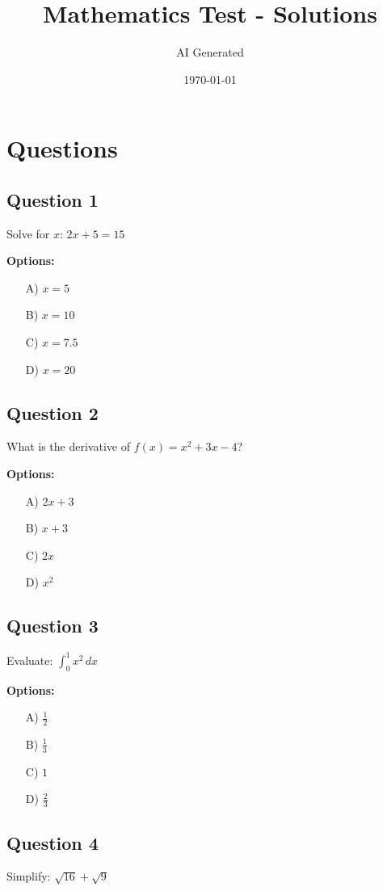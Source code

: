 \documentclass[12pt]{article}
\title{Mathematics Test - Solutions}
\author{AI Generated}
\date{\today}
\begin{document}
\maketitle

\section*{Questions}

\subsection*{Question 1}
Solve for $x$: $2x + 5 = 15$

\textbf{Options:}
\begin{itemize}
    \item[A)] $x = 5$
    \item[B)] $x = 10$
    \item[C)] $x = 7.5$
    \item[D)] $x = 20$
\end{itemize}

\subsection*{Question 2}
What is the derivative of $f(x) = x^2 + 3x - 4$?

\textbf{Options:}
\begin{itemize}
    \item[A)] $2x + 3$
    \item[B)] $x + 3$
    \item[C)] $2x$
    \item[D)] $x^2$
\end{itemize}

\subsection*{Question 3}
Evaluate: $\int_0^1 x^2 \, dx$

\textbf{Options:}
\begin{itemize}
    \item[A)] $\frac{1}{2}$
    \item[B)] $\frac{1}{3}$
    \item[C)] $1$
    \item[D)] $\frac{2}{3}$
\end{itemize}

\subsection*{Question 4}
Simplify: $\sqrt{16} + \sqrt{9}$
\end{document}
